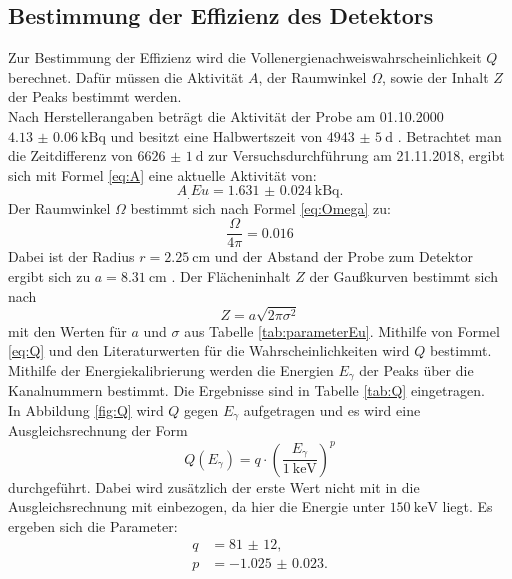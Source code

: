 \subsection{Bestimmung der Effizienz des Detektors}

Zur Bestimmung der Effizienz wird die Vollenergienachweiswahrscheinlichkeit $Q$ berechnet. Dafür müssen die Aktivität $A$, der Raumwinkel $\Omega$, sowie der Inhalt $Z$ der Peaks bestimmt werden.\\
Nach Herstellerangaben beträgt die Aktivität der Probe am 01.10.2000 $\SI{4.13(6)}{\kilo\becquerel}$ und besitzt eine Halbwertszeit von $\SI{4943(5)}{\day}$ \cite{V18}. Betrachtet man die Zeitdifferenz von $\SI{6626(1)}{\day}$ zur Versuchsdurchführung am 21.11.2018, ergibt sich mit Formel \eqref{eq:A} eine aktuelle Aktivität von:
\[
A_.{Eu}=\SI{1.631(24)}{\kilo\becquerel}\text{.}
\]
Der Raumwinkel $\Omega$ bestimmt sich nach Formel \eqref{eq:Omega} zu:
\[
\frac{\Omega}{4\pi} = \num{0.016}
\]
Dabei ist der Radius $r=\SI{2.25}{\centi\metre}$ und der Abstand der Probe zum Detektor ergibt sich zu $a=\SI{8.31}{\centi\metre}$ \cite{V18}.
Der Flächeninhalt $Z$ der Gaußkurven bestimmt sich nach
\begin{equation}
Z = a\sqrt{2\pi\sigma^2} \label{eq:I_Gaus}
\end{equation}
mit den Werten für $a$ und $\sigma$ aus Tabelle \ref{tab:parameterEu}.
Mithilfe von Formel \eqref{eq:Q} und den Literaturwerten für die Wahrscheinlichkeiten \cite{MARTIN20131497} wird $Q$ bestimmt.
Mithilfe der Energiekalibrierung werden die Energien $E_\gamma$ der Peaks über die Kanalnummern bestimmt. Die Ergebnisse sind in Tabelle \ref{tab:Q} eingetragen.\\
In Abbildung \ref{fig:Q} wird $Q$ gegen $E_\gamma$ aufgetragen und es wird eine Ausgleichsrechnung der Form
\[
Q(E_\gamma)=q\cdot \left(\frac{E_\gamma}{\SI{1}{\kilo\electronvolt}}\right)^p
\] 
durchgeführt. Dabei wird zusätzlich der erste Wert nicht mit in die Ausgleichsrechnung mit einbezogen, da hier die Energie unter $\SI{150}{\kilo\electronvolt}$ liegt.  
Es ergeben sich die Parameter:
\begin{align*}
q	&=	\num{81(12)}\text{,}\\
p	&=	\num{-1.025(23)}\text{.}
\end{align*}

